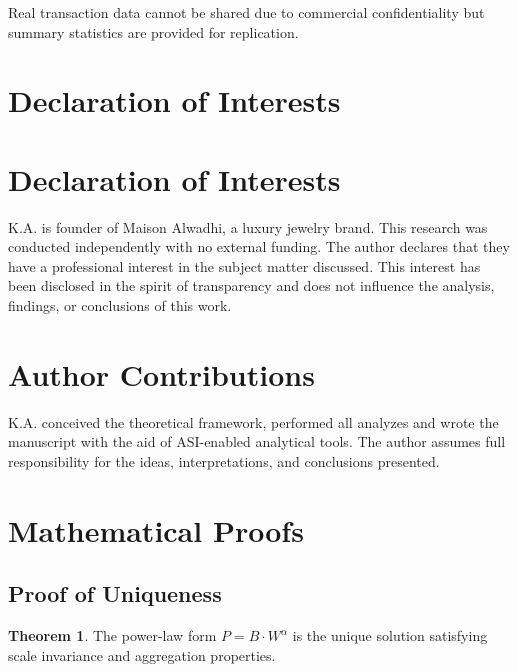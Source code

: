 \documentclass[12pt,a4paper]{article}
\theoremstyle{definition}
\newtheorem{theorem}{Theorem}
\theoremstyle{remark}
\begin{document}
Real transaction data cannot be shared due to commercial confidentiality but summary statistics are provided for replication.

\section*{Declaration of Interests}

\section*{Declaration of Interests}

K.A. is founder of Maison Alwadhi, a luxury jewelry brand. This research was conducted independently with no external funding. The author declares that they have a professional interest in the subject matter discussed. This interest has been disclosed in the spirit of transparency and does not influence the analysis, findings, or conclusions of this work. 

\section*{Author Contributions}

K.A. conceived the theoretical framework, performed all analyzes and wrote the manuscript with the aid of ASI-enabled analytical tools. The author assumes full responsibility for the ideas, interpretations, and conclusions presented.





\newpage






\appendix

\section{Mathematical Proofs}

\subsection{Proof of Uniqueness}

\begin{theorem}
The power-law form $P = B \cdot W^{\alpha}$ is the unique solution satisfying scale invariance and aggregation properties.
\end{theorem}
\end{document}
